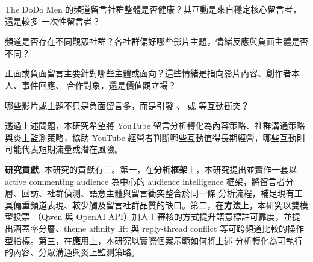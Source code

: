 \begin{description}[leftmargin=3.4em,style=nextline,itemsep=3pt]
  \item[\textbf{RQ1}] The DoDo Men 的頻道留言社群整體是否健康？其互動是來自穩定核心留言者，還是較多
        一次性留言者？
  \item[\textbf{RQ2}] 頻道是否存在不同觀眾社群？各社群偏好哪些影片主題，情緒反應與負面主體是否不同？
  \item[\textbf{RQ3}] 正面或負面留言主要針對哪些主體或面向？這些情緒是指向影片內容、創作者本人、事件回應、
        合作對象，還是價值觀立場？
  \item[\textbf{RQ4}] 哪些影片或主題不只是負面留言多，而是引發 、 或
         等互動衝突？
\end{description}

透過上述問題，本研究希望將 YouTube 留言分析轉化為內容策略、社群溝通策略與炎上監測策略，協助 YouTube
經營者判斷哪些互動值得長期經營，哪些互動則可能代表短期流量或潛在風險。

\textbf{研究貢獻.} 本研究的貢獻有三。第一，在\textbf{分析框架}上，本研究提出並實作一套以 active commenting
audience 為中心的 audience intelligence 框架，將留言者分層、回訪、社群偵測、語意主體與留言衝突整合於同一條
分析流程，補足現有工具偏重頻道表現、較少觸及留言社群品質的缺口。第二，在\textbf{方法}上，本研究以雙模型投票
（Qwen 與 OpenAI API）加人工審核的方式提升語意標註可靠度，並提出涵蓋率分層、theme affinity lift 與
reply-thread conflict 等可跨頻道比較的操作型指標。第三，在\textbf{應用}上，本研究以實際個案示範如何將上述
分析轉化為可執行的內容、分眾溝通與炎上監測策略。
